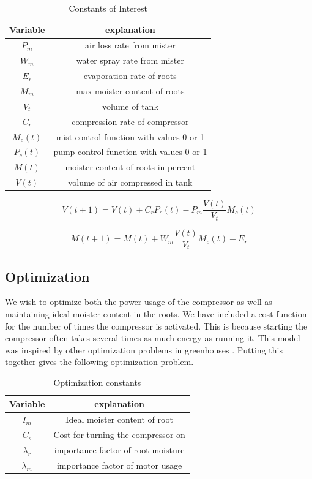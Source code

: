 \documentclass[a4paper,12pt]{article}
\begin{document}
\begin{table}[ht]
\caption{Constants of Interest}
\centering
\begin{tabular} {c c}
\hline\hline
 Variable & explanation \\ [0.5ex]
\hline
$P_m$ & air loss rate from mister \\
$W_m$ & water spray rate from mister \\
$E_r$ & evaporation rate of roots \\ 
$M_m$ & max moister content of roots \\ 
$V_t$ & volume of tank \\
$C_r$ & compression rate of compressor \\
$M_c(t)$ & mist control function with values 0 or 1 \\
$P_c(t)$ & pump control function with values 0 or 1 \\
$M(t)$ & moister content of roots in percent \\
$V(t)$ & volume of air compressed in tank \\
\hline
\end{tabular}
\end{table}

\begin{equation}
		  V(t+1) = V(t) + C_r P_c(t) - P_m \frac{V(t)}{V_t} M_c(t)
\end{equation}

\begin{equation}
		  M(t+1) = M(t) + W_m \frac{V(t)}{V_t} M_c(t) - E_r
\end{equation}

\subsection{Optimization}

We wish to optimize both the power usage of the compressor as well as maintaining ideal moister content in the roots. We have included a cost function for the number of times the compressor is activated. This is because starting the compressor often takes several times as much energy as running it. This model was inspired by other optimization problems in greenhouses \cite{chalabi1996real}. Putting this together gives the following optimization problem.

\begin{table}[ht]
\caption{Optimization constants}
\centering
\begin{tabular} {c c}
\hline\hline
 Variable & explanation \\ [0.5ex]
\hline
$I_m$ & Ideal moister content of root \\
$C_s$ & Cost for turning the compressor on \\
$\lambda_r$ & importance factor of root moisture \\
$\lambda_m$ & importance factor of motor usage \\ 
\hline
\end{tabular}
\end{table}
\end{document}
